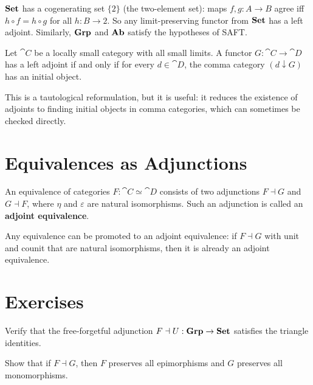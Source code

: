 \begin{example}
$\mathbf{Set}$ has a cogenerating set $\{2\}$ (the two-element set): maps $f, g: A \to B$ agree iff $h \circ f = h \circ g$ for all $h: B \to 2$. So any limit-preserving functor from $\mathbf{Set}$ has a left adjoint. Similarly, $\mathbf{Grp}$ and $\mathbf{Ab}$ satisfy the hypotheses of SAFT.
\end{example}

\begin{theorem}
Let $\cat{C}$ be a locally small category with all small limits. A functor $G: \cat{C} \to \cat{D}$ has a left adjoint if and only if for every $d \in \cat{D}$, the comma category $(d \downarrow G)$ has an initial object.
\end{theorem}

This is a tautological reformulation, but it is useful: it reduces the existence of adjoints to finding initial objects in comma categories, which can sometimes be checked directly.

\section{Equivalences as Adjunctions}

\begin{proposition}
An equivalence of categories $F: \cat{C} \simeq \cat{D}$ consists of two adjunctions $F \dashv G$ and $G \dashv F$, where $\eta$ and $\varepsilon$ are natural isomorphisms. Such an adjunction is called an \textbf{adjoint equivalence}.
\end{proposition}

\begin{proposition}
Any equivalence can be promoted to an adjoint equivalence: if $F \dashv G$ with unit and counit that are natural isomorphisms, then it is already an adjoint equivalence.
\end{proposition}

\section{Exercises}

\begin{exercise}
Verify that the free-forgetful adjunction $F \dashv U: \mathbf{Grp} \to \mathbf{Set}$ satisfies the triangle identities.
\end{exercise}

\begin{exercise}
Show that if $F \dashv G$, then $F$ preserves all epimorphisms and $G$ preserves all monomorphisms.
\end{exercise}


